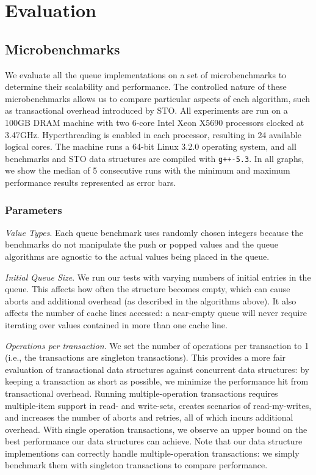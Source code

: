 \section{Evaluation}

\subsection{Microbenchmarks}
\label{q_microbenchmarks}

We evaluate all the queue implementations on a set of microbenchmarks to determine their scalability and performance. The controlled nature of these microbenchmarks allows us to compare particular aspects of each algorithm, such as transactional overhead introduced by STO. All experiments are run on a 100GB DRAM machine with two 6-core Intel Xeon X5690 processors clocked at 3.47GHz. Hyperthreading is enabled in each processor, resulting in 24 available logical cores. The machine runs a 64-bit Linux 3.2.0 operating system, and all benchmarks and STO data structures are compiled with \texttt{g++-5.3}. In all graphs, we show the median of 5 consecutive runs with the minimum and maximum performance results represented as error bars.

\subsubsection{Parameters}

\emph{Value Types}. Each queue benchmark uses randomly chosen integers because the benchmarks do not manipulate the push or popped values and the queue algorithms are agnostic to the actual values being placed in the queue.

\emph{Initial Queue Size}. We run our tests with varying numbers of initial entries in the queue. This affects how often the structure becomes empty, which can cause aborts and additional overhead (as described in the algorithms above). It also affects the number of cache lines accessed: a near-empty queue will never require iterating over values contained in more than one cache line.

\emph{Operations per transaction}. We set the number of operations per transaction to 1 (i.e., the transactions are singleton transactions). This provides a more fair evaluation of transactional data structures against concurrent data structures: by keeping a transaction as short as possible, we minimize the performance hit from transactional overhead. Running multiple-operation transactions requires multiple-item support in read- and write-sets, creates scenarios of read-my-writes, and increases the number of aborts and retries, all of which incurs additional overhead. With single operation transactions, we observe an upper bound on the best performance our data structures can achieve. Note that our data structure implementions can correctly handle multiple-operation transactions: we simply benchmark them with singleton transactions to compare performance.

